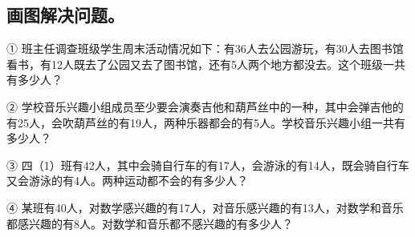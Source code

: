 \subsection*{画图解决问题。}
\noindent ① 班主任调查班级学生周末活动情况如下：有36人去公园游玩，有30人去图书馆看书，有12人既去了公园又去了图书馆，还有5人两个地方都没去。这个班级一共有多少人？\par
{}
\noindent ② 学校音乐兴趣小组成员至少要会演奏吉他和葫芦丝中的一种，其中会弹吉他的有25人，会吹葫芦丝的有19人，两种乐器都会的有5人。学校音乐兴趣小组一共有多少人？\par
{}
\noindent ③ 四（1）班有42人，其中会骑自行车的有17人，会游泳的有14人，既会骑自行车又会游泳的有4人。两种运动都不会的有多少人？\par
{}
\noindent ④ 某班有40人，对数学感兴趣的有17人，对音乐感兴趣的有13人，对数学和音乐都感兴趣的有8人。对数学和音乐都不感兴趣的有多少人？\par
{}
